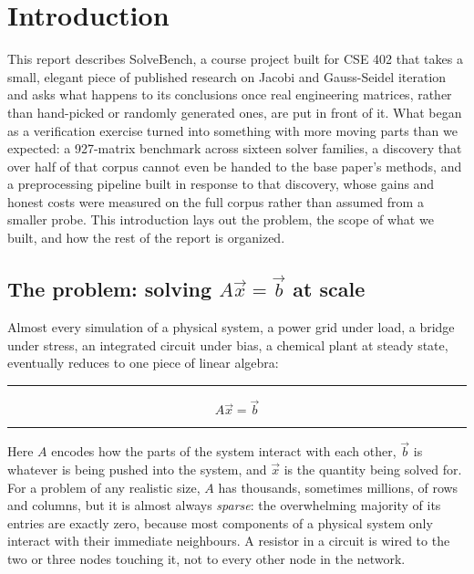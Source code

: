 \documentclass[11pt,a4paper]{article}
\newenvironment{formulabox}
  {\begin{center}\color{SBteal}\rule{0.92\linewidth}{0.8pt}\par\vspace{5pt}\color{SBnavy}}
  {\par\vspace{3pt}\color{SBteal}\rule{0.92\linewidth}{0.8pt}\end{center}}
\begin{document}
\clearpage
\pagestyle{fancy}

\tableofcontents
\clearpage
\listoffigures
\clearpage
\listoftables
\clearpage
{}
\setcounter{page}{1}

\section{Introduction}
\label{sec:intro}

This report describes SolveBench, a course project built for CSE 402 that takes a small,
elegant piece of published research on Jacobi and Gauss-Seidel iteration and asks what
happens to its conclusions once real engineering matrices, rather than hand-picked or
randomly generated ones, are put in front of it. What began as a verification exercise
turned into something with more moving parts than we expected: a 927-matrix benchmark
across sixteen solver families, a discovery that over half of that corpus cannot even be
handed to the base paper's methods, and a preprocessing pipeline built in response to that
discovery, whose gains and honest costs were measured on the full corpus rather than
assumed from a smaller probe. This introduction lays out the problem, the scope of what we
built, and how the rest of the report is organized.

\subsection{The problem: solving \texorpdfstring{$A\vec{x}=\vec{b}$}{Ax=b} at scale}
\label{sec:intro-problem}

Almost every simulation of a physical system, a power grid under load, a bridge under
stress, an integrated circuit under bias, a chemical plant at steady state, eventually
reduces to one piece of linear algebra:

\begin{formulabox}
$$A\vec{x} = \vec{b}$$
\end{formulabox}

Here $A$ encodes how the parts of the system interact with each other, $\vec{b}$ is
whatever is being pushed into the system, and $\vec{x}$ is the quantity being solved for.
For a problem of any realistic size, $A$ has thousands, sometimes millions, of rows and
columns, but it is almost always \emph{sparse}: the overwhelming majority of its entries
are exactly zero, because most components of a physical system only interact with their
immediate neighbours. A resistor in a circuit is wired to the two or three nodes touching
it, not to every other node in the network.
\end{document}
